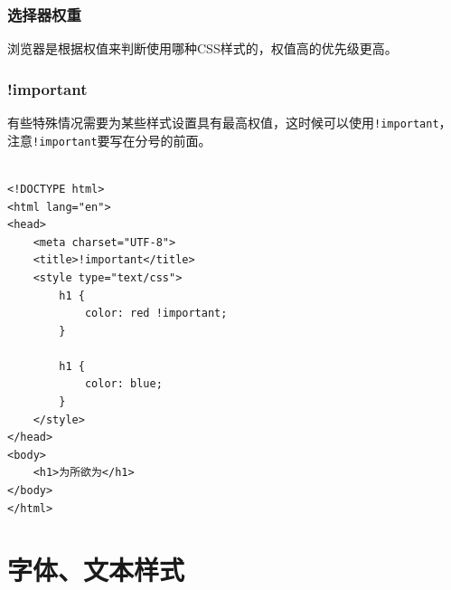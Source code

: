 \subsection{选择器权重}

浏览器是根据权值来判断使用哪种CSS样式的，权值高的优先级更高。

\begin{table}[H]
    \centering
    \caption{选择器权重}
\end{table}

\subsection{!important}

有些特殊情况需要为某些样式设置具有最高权值，这时候可以使用\lstinline|!important|，注意\lstinline|!important|要写在分号的前面。 \\

 \\
\begin{lstlisting}[style=htmlcssjs]
<!DOCTYPE html>
<html lang="en">
<head>
    <meta charset="UTF-8">
    <title>!important</title>
    <style type="text/css">
        h1 {
            color: red !important;
        }

        h1 {
            color: blue;
        }
    </style>
</head>
<body>
    <h1>为所欲为</h1>
</body>
</html>
\end{lstlisting}

\newpage

\chapter{字体、文本样式}

